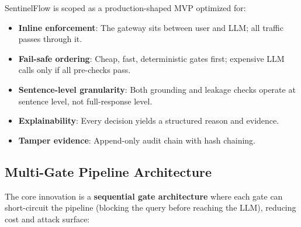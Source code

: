 \documentclass[12pt,a4paper]{article}
\begin{document}
SentinelFlow is scoped as a production-shaped MVP optimized for:
\begin{itemize}[leftmargin=*]
    \item \textbf{Inline enforcement}: The gateway sits between user and LLM; all traffic passes through it.
    \item \textbf{Fail-safe ordering}: Cheap, fast, deterministic gates first; expensive LLM calls only if all pre-checks pass.
    \item \textbf{Sentence-level granularity}: Both grounding and leakage checks operate at sentence level, not full-response level.
    \item \textbf{Explainability}: Every decision yields a structured reason and evidence.
    \item \textbf{Tamper evidence}: Append-only audit chain with hash chaining.
\end{itemize}

\subsection{Multi-Gate Pipeline Architecture}

The core innovation is a \textbf{sequential gate architecture} where each gate can short-circuit the pipeline (blocking the query before reaching the LLM), reducing cost and attack surface:
\end{document}
